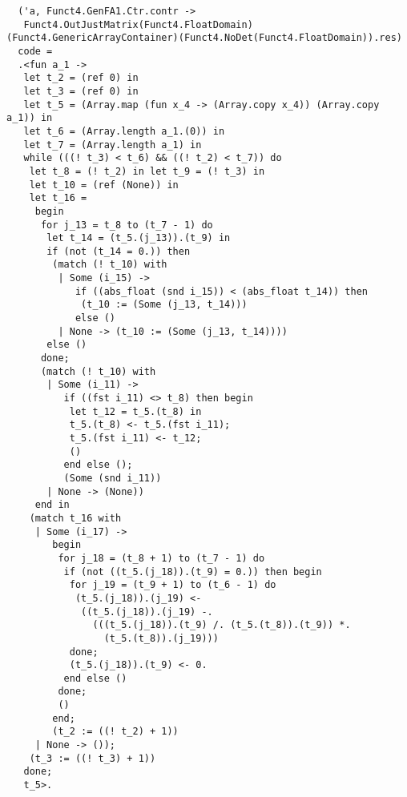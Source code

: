 \documentclass[landscape]{slides}
\begin{document}
\begin{slide}
\begin{small}
\begin{verbatim}
  ('a, Funct4.GenFA1.Ctr.contr ->
   Funct4.OutJustMatrix(Funct4.FloatDomain)(Funct4.GenericArrayContainer)(Funct4.NoDet(Funct4.FloatDomain)).res)
  code =
  .<fun a_1 ->
   let t_2 = (ref 0) in
   let t_3 = (ref 0) in
   let t_5 = (Array.map (fun x_4 -> (Array.copy x_4)) (Array.copy a_1)) in
   let t_6 = (Array.length a_1.(0)) in
   let t_7 = (Array.length a_1) in
   while (((! t_3) < t_6) && ((! t_2) < t_7)) do
    let t_8 = (! t_2) in let t_9 = (! t_3) in
    let t_10 = (ref (None)) in
    let t_16 =
     begin
      for j_13 = t_8 to (t_7 - 1) do
       let t_14 = (t_5.(j_13)).(t_9) in
       if (not (t_14 = 0.)) then
        (match (! t_10) with
         | Some (i_15) ->
            if ((abs_float (snd i_15)) < (abs_float t_14)) then
             (t_10 := (Some (j_13, t_14)))
            else ()
         | None -> (t_10 := (Some (j_13, t_14))))
       else ()
      done;
      (match (! t_10) with
       | Some (i_11) ->
          if ((fst i_11) <> t_8) then begin
           let t_12 = t_5.(t_8) in
           t_5.(t_8) <- t_5.(fst i_11);
           t_5.(fst i_11) <- t_12;
           ()
          end else ();
          (Some (snd i_11))
       | None -> (None))
     end in
    (match t_16 with
     | Some (i_17) ->
        begin
         for j_18 = (t_8 + 1) to (t_7 - 1) do
          if (not ((t_5.(j_18)).(t_9) = 0.)) then begin
           for j_19 = (t_9 + 1) to (t_6 - 1) do
            (t_5.(j_18)).(j_19) <-
             ((t_5.(j_18)).(j_19) -.
               (((t_5.(j_18)).(t_9) /. (t_5.(t_8)).(t_9)) *.
                 (t_5.(t_8)).(j_19)))
           done;
           (t_5.(j_18)).(t_9) <- 0.
          end else ()
         done;
         ()
        end;
        (t_2 := ((! t_2) + 1))
     | None -> ());
    (t_3 := ((! t_3) + 1))
   done;
   t_5>.


\end{verbatim}
\end{small}
\end{slide}
\end{document}
